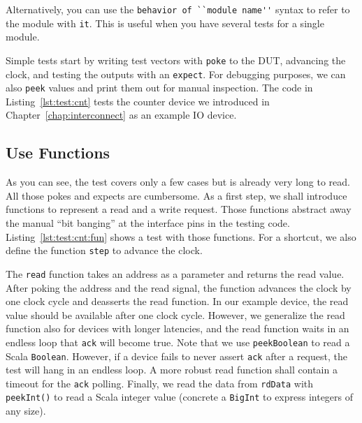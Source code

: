 \documentclass[%
    10pt,
    headinclude, footexclude,
    openright, %
    notitlepage,
    cleardoubleempty,
    headsepline,
    pointlessnumbers,
    bibtotoc, idxtotoc,
    ]{scrbook}
\newcommand{\code}[1]{{\lstinline[basicstyle=\small\ttfamily]{#1}}}
\begin{document}

Alternatively, you can use the \code{behavior of ``module name''} syntax to
refer to the module with \code{it}. This is useful when you have several tests for a
single module.


Simple tests start by writing test vectors with \code{poke} to the DUT, advancing the
clock, and testing the outputs with an \code{expect}. For debugging purposes, we can also
\code{peek} values and print them out for manual inspection. The code in Listing~\ref{lst:test:cnt} tests the
counter device we introduced in Chapter~\ref{chap:interconnect} as an example IO device.


\subsection{Use Functions}

As you can see, the test covers only a few cases but is already very long to read.
All those pokes and expects are cumbersome. As a first step, we shall introduce
functions to represent a read and a write request. Those functions abstract away the manual
``bit banging'' at the interface pins in the testing code.
Listing~\ref{lst:test:cnt:fun} shows a test with those functions. For a shortcut, we also define
the function \code{step} to advance the clock.


The \code{read} function takes an address
as a parameter and returns the read value. After poking the address and the read signal, the function
advances the clock by one clock cycle and deasserts the read function. In our example device,
the read value should be available after one clock cycle. However, we generalize the read function
also for devices with longer latencies, and the read function waits in an endless loop that \code{ack}
will become true. Note that we use \code{peekBoolean} to read a Scala \code{Boolean}.
However, if a device fails to never assert \code{ack} after a request,
the test will hang in an endless loop. A more robust read function shall contain a timeout for the \code{ack}
polling. Finally, we read the data from \code{rdData} with \code{peekInt()} to read a Scala integer
value (concrete a \code{BigInt} to express integers of any size).
\end{document}
